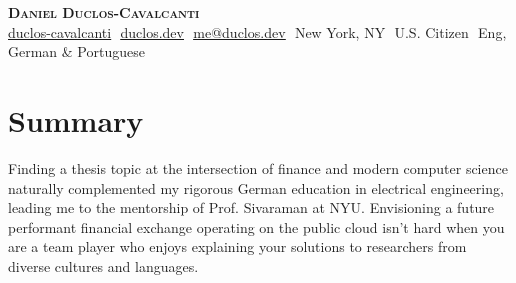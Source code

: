 \documentclass[letterpaper,11pt]{article}
\begin{document}
\begin{flushright}
\end{flushright}

\vspace{-5pt}

\begin{center}
    \textbf{\Huge \scshape Daniel Duclos-Cavalcanti} \\ \vspace{8pt}
    \small 
    \href{https://github.com/duclos-cavalcanti}{\underline{duclos-cavalcanti}} $  $
    \href{https://www.duclos.dev}{\underline{duclos.dev}} $  $
    \href{mailto:me@duclos.dev}{\underline{me@duclos.dev}} $ $
    New York, NY $ $
    U.S. Citizen $ $
    Eng, German \& Portuguese
\end{center}

\section{Summary}


\small{
Finding a thesis topic at the intersection of finance and modern computer science 
naturally complemented my rigorous German education in electrical engineering, 
leading me to the mentorship of Prof. Sivaraman at NYU. Envisioning a future 
performant financial exchange operating on the public cloud isn't hard when you are a 
team player who enjoys explaining your solutions to researchers from diverse cultures and languages.
}
\end{document}
